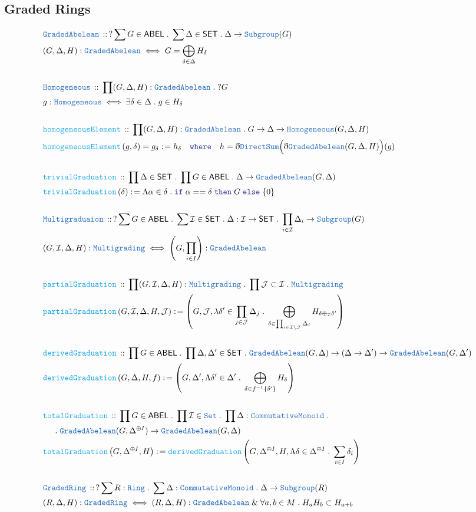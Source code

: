 \documentclass[12pt]{scrartcl}
\newcommand{\TYPE}[1]{\textcolor{NavyBlue}{\mathtt{#1}}}
\newcommand{\FUNC}[1]{\textcolor{Cerulean}{\mathtt{#1}}}
\newcommand{\LOGIC}[1]{\textcolor{Blue}{\mathtt{#1}}}
\renewcommand{\.}{\; . \;}
\newcommand{\de}{: \kern 0.1pc =}
\newcommand{\where}{\LOGIC{where}}
\newcommand{\If}{\LOGIC{if} \;}
\newcommand{\Then}{ \; \LOGIC{then} \;}
\newcommand{\Else}{\; \LOGIC{else} \;}
\newcommand{\Act}[1]{\left( #1 \right)}
\newcommand{\DeclareType}[2]{& \TYPE{#1} \, :: \, #2 \\}
\newcommand{\DefineType}[3]{& #1 : \TYPE{#2} \iff #3 \\}
\newcommand{\DeclareFunc}[2]{& \FUNC{#1} \, :: \, #2 \\}
\newcommand{\DefineFunc}[3]{&  \FUNC{#1}\Act{#2} \de #3 \\}
\newcommand{\DefineNamedFunc}[4]{&  \FUNC{#1}\Act{#2} = #3 \de #4 \\}
\newcommand{\NewLine}{\\ & \kern 1pc}
\newcommand{\Page}[1]{ \begin{align*} #1 \end{align*}   }
\newcommand{ \bd }{ \ByDef }
\renewcommand{\And}{\; \& \;}
\newcommand{\Set}{\TYPE{Set}}
\newcommand{\ByDef}{\eth}
\newcommand{\I}{\mathcal{I}}
\newcommand{\J}{\mathcal{J}}
\newcommand{\SET}{\mathsf{SET}}
\newcommand{\ABEL}{\mathsf{ABEL}}
\newcommand{\Ring}{\TYPE{Ring}}
\newcommand{\GA}{\TYPE{GradedAbelean}}
\begin{document}
\subsection{Graded Rings}
\Page{
	\DeclareType{GradedAbelean}{ ? \sum G \in \ABEL \. \sum \Delta \in \SET \. \Delta \to \TYPE{Subgroup}(G)}
	\DefineType{(G,\Delta,H)}{GradedAbelean}{G = \bigoplus_{\delta \in \Delta} H_\delta}
	\\
	\DeclareType{Homogeneous}{ \prod (G,\Delta,H) : \GA \. ?G }
	\DefineType{g}{Homogeneous}{\exists \delta \in \Delta \. g \in H_\delta}
	\\
	\DeclareFunc{homogeneousElement}{\prod (G,\Delta,H) : \GA \. G \to \Delta \to \TYPE{Homogeneous}(G,\Delta,H) }
	\DefineNamedFunc{homogeneousElement}{g,\delta}{g_\delta}{h_\delta  \quad \where \quad h = \bd \TYPE{DirectSum}\Big(\bd \GA(G,\Delta,H)\Big)(g)}
	\\
	\DeclareFunc{trivialGraduation}{\prod \Delta \in \SET \. \prod G \in \ABEL \. \Delta \to \GA(G,\Delta)}
	\DefineFunc{trivialGraduation}{\delta}{\Lambda \alpha \in \delta \. \If \alpha == \delta \Then G \Else \{0\}}
	\\
	\DeclareType{Multigraduaion}{? \sum G \in \ABEL \. \sum \I \in \SET \. \Delta  : \I \to \SET \. \prod_{i \in \I} \Delta_i \to \TYPE{Subgroup}(G) }
	\DefineType{(G,\I,\Delta,H)}{Multigrading}{\left(G, \prod_{i \in I} \right) : \GA}
	\\
	\DeclareFunc{partialGraduation}{ \prod (G,\I,\Delta,H) : \TYPE{Multigrading} \. \prod \J \subset \I \. \TYPE{Multigrading} }
	\DefineFunc{partialGraduation}{G,\I,\Delta,H,\J}{
		\left( 
			G,
			\J, 
			\lambda \delta' \in \prod_{j \in \J} \Delta_j \. 
			\bigoplus_{\delta \in \prod_{i \in \I \setminus \J} \Delta_{ i} }  H_{\delta \oplus_{\I} \delta'}   
		\right)
	}
	\\
	\DeclareFunc{derivedGraduation}{\prod G \in \ABEL \. \prod \Delta,\Delta' \in \SET \. \GA(G,\Delta) \to (\Delta \to \Delta') \to  \GA(G,\Delta') }
	\DefineFunc{derivedGraduation}{ G,\Delta,H, f}{ \left(G,\Delta', \Lambda \delta' \in \Delta' \.  \bigoplus_{\delta \in f^{-1}\{\delta'\}} H_\delta  \right)  }
	\\
	\DeclareFunc{totalGraduation}{ 
		\prod G \in \ABEL \. 
		\prod \I \in \Set\. 
		\prod \Delta : \TYPE{CommutativeMonoid} \. \NewLine \.  
		\GA( G, \Delta^{\oplus I}) \to \GA(G,\Delta) 
	}
	\DefineFunc{totalGraduation}{G,\Delta^{\oplus I}, H}{\FUNC{derivedGraduation}
		\left(G,\Delta^{\oplus I},H,\Lambda \delta \in \Delta^{\oplus I} \. \sum_{i \in I} \delta_i  \right)}
	\\
	\DeclareType{GradedRing}{? \sum R : \Ring \. \sum \Delta : \TYPE{CommutativeMonoid} \.  \Delta \to \TYPE{Subgroup}(R) }
	\DefineType{(R ,\Delta,H)}{GradedRing}{ (R,\Delta,H) : \GA \And \forall a,b \in M \. H_a H_b \subset H_{a+b}  }
}
\end{document}

